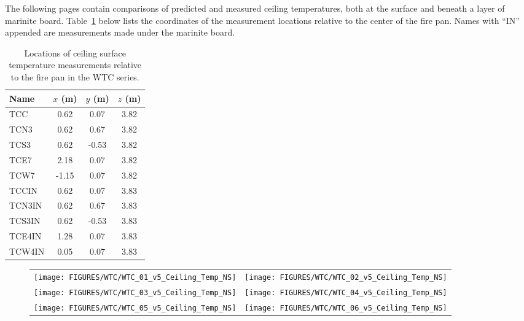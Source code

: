 The following pages contain comparisons of predicted and measured ceiling temperatures, both at the surface and beneath a layer of
marinite board. Table~\ref{WTC_Ceiling} below lists the coordinates of the measurement locations relative to the center of the fire pan.
Names with ``IN'' appended are measurements made under the marinite board.


\begin{table}[h!]
\caption{Locations of ceiling surface temperature measurements relative to the fire pan in the WTC series.}
\begin{center}
\begin{tabular}{|l|c|c|c|}
\hline
Name                & $x$ (m)   & $y$ (m)   & $z$ (m)   \\ \hline \hline
TCC                 & 0.62      & 0.07      & 3.82      \\ \hline
TCN3                & 0.62      & 0.67      & 3.82      \\ \hline
TCS3                & 0.62      & -0.53     & 3.82      \\ \hline
TCE7                & 2.18      & 0.07      & 3.82      \\ \hline
TCW7                & -1.15     & 0.07      & 3.82      \\ \hline \hline
TCCIN               & 0.62      & 0.07      & 3.83      \\ \hline
TCN3IN              & 0.62      & 0.67      & 3.83      \\ \hline
TCS3IN              & 0.62      & -0.53     & 3.83      \\ \hline
TCE4IN              & 1.28      & 0.07      & 3.83      \\ \hline
TCW4IN              & 0.05      & 0.07      & 3.83      \\ \hline
\end{tabular}
\end{center}
\label{WTC_Ceiling}
\end{table}

\begin{figure}[p]
\begin{tabular*}{\textwidth}{l@{\extracolsep{\fill}}r}
\texttt{[image: FIGURES/WTC/WTC\_01\_v5\_Ceiling\_Temp\_NS]} &
\texttt{[image: FIGURES/WTC/WTC\_02\_v5\_Ceiling\_Temp\_NS]} \\
\texttt{[image: FIGURES/WTC/WTC\_03\_v5\_Ceiling\_Temp\_NS]} &
\texttt{[image: FIGURES/WTC/WTC\_04\_v5\_Ceiling\_Temp\_NS]} \\
\texttt{[image: FIGURES/WTC/WTC\_05\_v5\_Ceiling\_Temp\_NS]} &
\texttt{[image: FIGURES/WTC/WTC\_06\_v5\_Ceiling\_Temp\_NS]}
\end{tabular*}
\label{NIST_WTC_Ceiling_NS}
\end{figure}

